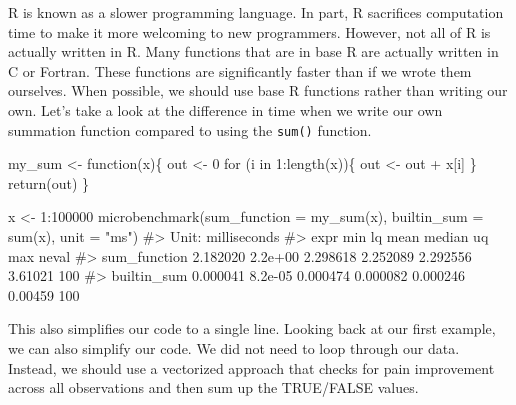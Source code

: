\documentclass[
  letterpaper,
]{latex/krantz}
\makeatletter
\newenvironment{Shaded}{\begin{snugshade}}{\end{snugshade}}
\newcommand{\AttributeTok}[1]{\textcolor[rgb]{0.40,0.45,0.13}{#1}}
\newcommand{\CommentTok}[1]{\textcolor[rgb]{0.37,0.37,0.37}{#1}}
\newcommand{\ControlFlowTok}[1]{\textcolor[rgb]{0.00,0.23,0.31}{#1}}
\newcommand{\DecValTok}[1]{\textcolor[rgb]{0.68,0.00,0.00}{#1}}
\newcommand{\FunctionTok}[1]{\textcolor[rgb]{0.28,0.35,0.67}{#1}}
\newcommand{\NormalTok}[1]{\textcolor[rgb]{0.00,0.23,0.31}{#1}}
\newcommand{\OtherTok}[1]{\textcolor[rgb]{0.00,0.23,0.31}{#1}}
\newcommand{\SpecialCharTok}[1]{\textcolor[rgb]{0.37,0.37,0.37}{#1}}
\newcommand{\StringTok}[1]{\textcolor[rgb]{0.13,0.47,0.30}{#1}}
\newenvironment{kframe}{%
\medskip{}
\setlength{\fboxsep}{.8em}
 \def\at@end@of@kframe{}%
 \ifinner\ifhmode%
  \def\at@end@of@kframe{\end{minipage}}%
  \begin{minipage}{\columnwidth}%
 \fi\fi%
 \def\FrameCommand##1{\hskip\@totalleftmargin \hskip-\fboxsep
 \colorbox{shadecolor}{##1}\hskip-\fboxsep
     \hskip-\linewidth \hskip-\@totalleftmargin \hskip\columnwidth}%
 \MakeFramed {\advance\hsize-\width
   \@totalleftmargin\z@ \linewidth\hsize
   \@setminipage}}%
 {\par\unskip\endMakeFramed%
 \at@end@of@kframe}
\renewenvironment{Shaded}{\begin{kframe}}{\end{kframe}}
\makeatother
\begin{document}
R is known as a slower programming language. In part, R sacrifices
computation time to make it more welcoming to new programmers. However,
not all of R is actually written in R. Many functions that are in base R
are actually written in C or Fortran. These functions are significantly
faster than if we wrote them ourselves. When possible, we should use
base R functions rather than writing our own. Let's take a look at the
difference in time when we write our own summation function compared to
using the \texttt{sum()} function.

\begin{Shaded}
\begin{Highlighting}[]
\NormalTok{my\_sum }\OtherTok{\textless{}{-}} \ControlFlowTok{function}\NormalTok{(x)\{}
\NormalTok{  out }\OtherTok{\textless{}{-}} \DecValTok{0}
  \ControlFlowTok{for}\NormalTok{ (i }\ControlFlowTok{in} \DecValTok{1}\SpecialCharTok{:}\FunctionTok{length}\NormalTok{(x))\{}
\NormalTok{    out }\OtherTok{\textless{}{-}}\NormalTok{ out }\SpecialCharTok{+}\NormalTok{ x[i]}
\NormalTok{  \}}
  \FunctionTok{return}\NormalTok{(out)}
\NormalTok{\}}

\NormalTok{x }\OtherTok{\textless{}{-}} \DecValTok{1}\SpecialCharTok{:}\DecValTok{100000}
\FunctionTok{microbenchmark}\NormalTok{(}\AttributeTok{sum\_function =} \FunctionTok{my\_sum}\NormalTok{(x),}
               \AttributeTok{builtin\_sum =} \FunctionTok{sum}\NormalTok{(x),}
               \AttributeTok{unit =} \StringTok{"ms"}\NormalTok{)}
\CommentTok{\#\textgreater{} Unit: milliseconds}
\CommentTok{\#\textgreater{}          expr      min      lq     mean   median       uq     max neval}
\CommentTok{\#\textgreater{}  sum\_function 2.182020 2.2e+00 2.298618 2.252089 2.292556 3.61021   100}
\CommentTok{\#\textgreater{}   builtin\_sum 0.000041 8.2e{-}05 0.000474 0.000082 0.000246 0.00459   100}
\end{Highlighting}
\end{Shaded}

This also simplifies our code to a single line. Looking back at our
first example, we can also simplify our code. We did not need to loop
through our data. Instead, we should use a vectorized approach that
checks for pain improvement across all observations and then sum up the
TRUE/FALSE values.
\end{document}
